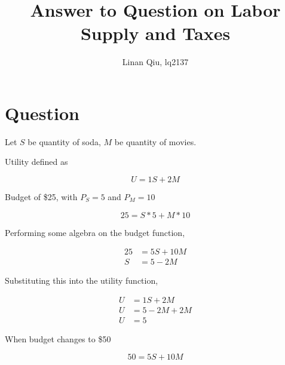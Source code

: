 \documentclass[11pt]{scrartcl}
\title{Answer to Question on Labor Supply and Taxes}
\author{Linan Qiu, lq2137}
\begin{document}
\maketitle

\section{Question}

Let $S$ be quantity of soda, $M$ be quantity of movies.

Utility defined as

\[ U = 1S + 2M\]

Budget of \$25, with $P_S = 5$ and $P_M = 10$

\[25 = S * 5 + M * 10\]

Performing some algebra on the budget function,

\begin{align*}
25 &= 5S + 10M \\
S &= 5 - 2M
\end{align*}

Substituting this into the utility function,

\begin{align*}
U &= 1S + 2M \\
U &= 5 -2M + 2M \\
U &= 5
\end{align*}

When budget changes to \$50

\[50 = 5S + 10M \]
\end{document}
